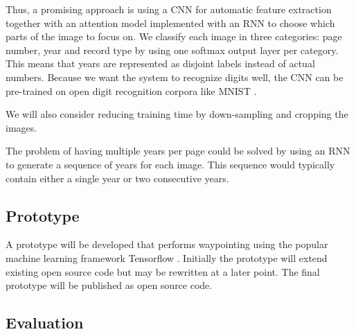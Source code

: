Thus, a promising approach is using a CNN for automatic feature extraction together with an attention model implemented with an RNN to choose which parts of the image to focus on.
We classify each image in three categories: page number, year and record type by using one softmax output layer per category. This means that years are represented as disjoint labels instead of actual numbers.
Because we want the system to recognize digits well,
the CNN can be pre-trained on open digit recognition corpora like MNIST \cite{MNIST}.

We will also consider reducing training time by down-sampling and cropping the images.



The problem of having multiple years per page could be solved by using an RNN to generate a sequence of years for each image. This sequence would typically contain either a single year or two consecutive years.

\subsection{Prototype}

A prototype will be developed that performs waypointing using the popular machine learning framework Tensorflow \cite{Tensorflow}. Initially the prototype will extend existing open source code \cite{GithubAttendAndTell} but may be rewritten at a later point. The final prototype will be published as open source code.

\subsection{Evaluation}

